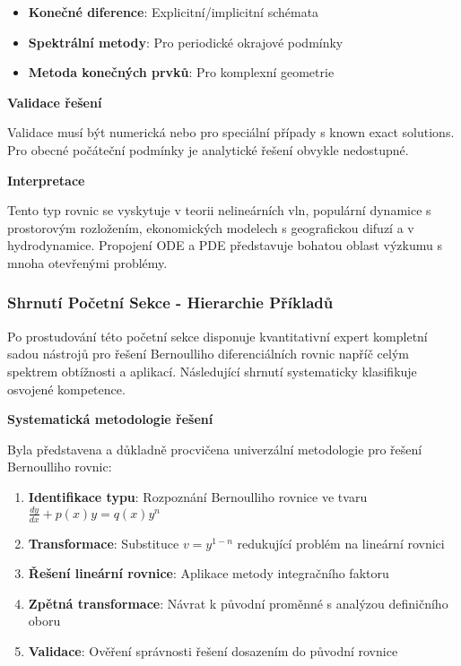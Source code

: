 \begin{example}
\begin{itemize}
\item \textbf{Konečné diference}: Explicitní/implicitní schémata
\item \textbf{Spektrální metody}: Pro periodické okrajové podmínky  
\item \textbf{Metoda konečných prvků}: Pro komplexní geometrie
\end{itemize}

\vspace{1.5\baselineskip}

\noindent\textbf{Validace řešení}

Validace musí být numerická nebo pro speciální případy s known exact solutions. 
Pro obecné počáteční podmínky je analytické řešení obvykle nedostupné.

\vspace{1.5\baselineskip}

\noindent\textbf{Interpretace}

Tento typ rovnic se vyskytuje v teorii nelineárních vln, populární dynamice 
s prostorovým rozložením, ekonomických modelech s geografickou difuzí a 
v hydrodynamice. Propojení ODE a PDE představuje bohatou oblast výzkumu 
s mnoha otevřenými problémy.

\end{example}

\subsubsection{Shrnutí Početní Sekce - Hierarchie Příkladů}
\label{subsubsec:shrnutí-početní-sekce}

Po prostudování této početní sekce disponuje kvantitativní expert kompletní sadou nástrojů pro řešení Bernoulliho diferenciálních rovnic napříč celým spektrem obtížnosti a aplikací. Následující shrnutí systematicky klasifikuje osvojené kompetence.

\vspace{1\baselineskip}

\noindent\textbf{Systematická metodologie řešení}

Byla představena a důkladně procvičena univerzální metodologie pro řešení Bernoulliho rovnic:
\begin{enumerate}
\item \textbf{Identifikace typu}: Rozpoznání Bernoulliho rovnice ve tvaru $\frac{dy}{dx} + p(x)y = q(x)y^n$
\item \textbf{Transformace}: Substituce $v = y^{1-n}$ redukující problém na lineární rovnici
\item \textbf{Řešení lineární rovnice}: Aplikace metody integračního faktoru
\item \textbf{Zpětná transformace}: Návrat k původní proměnné s analýzou definičního oboru
\item \textbf{Validace}: Ověření správnosti řešení dosazením do původní rovnice
\end{enumerate}

